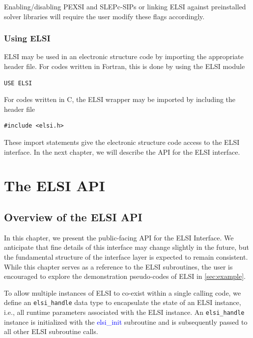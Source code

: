 \documentclass{report}
\begin{document}
Enabling/disabling PEXSI and SLEPc-SIPs or linking ELSI against preinstalled solver libraries will require the user modify these flags accordingly.

\subsection{Using ELSI}
\label{subsec:import_use}
ELSI may be used in an electronic structure code by importing the appropriate header file. For codes written in Fortran, this is done by using the ELSI module
\begin{tcolorbox}
\begin{verbatim}
USE ELSI
\end{verbatim}
\end{tcolorbox}

For codes written in C, the ELSI wrapper may be imported by including the header file
\begin{tcolorbox}
\begin{verbatim}
#include <elsi.h>
\end{verbatim}
\end{tcolorbox}

These import statements give the electronic structure code access to the ELSI interface. In the next chapter, we will describe the API for the ELSI interface.

\chapter{The ELSI API}
\section{Overview of the ELSI API}
\label{sec:api}
In this chapter, we present the public-facing API for the ELSI Interface. We anticipate that fine details of this interface may change slightly in the future, but the fundamental structure of the interface layer is expected to remain consistent. While this chapter serves as a reference to the ELSI subroutines, the user is encouraged to explore the demonstration pseudo-codes of ELSI in \ref{sec:example}.

To allow multiple instances of ELSI to co-exist within a single calling code, we define an \texttt{elsi\_handle} data type to encapsulate the state of an ELSI instance, i.e., all runtime parameters associated with the ELSI instance. An \texttt{elsi\_handle} instance is initialized with the \textcolor{blue}{elsi\_init} subroutine and is subsequently passed to all other ELSI subroutine calls.
\end{document}
